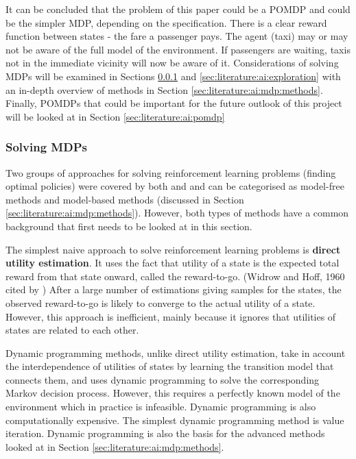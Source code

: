 It can be concluded that the problem of this paper could be a POMDP and could
be the simpler MDP, depending on the specification. There is a clear reward
function between states - the fare a passenger pays. The agent (taxi) may or
may not be aware of the full model of the environment. If passengers are
waiting, taxis not in the immediate vicinity will now be aware of it.
Considerations of solving MDPs will be examined in Sections
\ref{sec:literature:ai:mdp:solving} and \ref{sec:literature:ai:exploration}
with an in-depth overview of methods in Section
\ref{sec:literature:ai:mdp:methods}. Finally, POMDPs that could be important
for the future outlook of this project will be looked at in Section
\ref{sec:literature:ai:pomdp}


\subsubsection{Solving MDPs}
\label{sec:literature:ai:mdp:solving}

Two groups of approaches for solving reinforcement learning problems (finding
optimal policies) were covered by both \textcite{Russell2010ai+modern} and
\textcite{Sutton1998ai+reinforcement} and can be categorised as model-free
methods and model-based methods (discussed in Section
\ref{sec:literature:ai:mdp:methods}). However, both types of methods have a
common background that first needs to be looked at in this section.

The simplest naive approach to solve reinforcement learning problems is
\textbf{direct utility estimation}. It uses the fact that utility of a state is
the expected total reward from that state onward, called the reward-to-go.
(Widrow and Hoff, 1960 cited by \textcite{Russell2010ai+modern}) After a large
number of estimations giving samples for the states, the observed reward-to-go
is likely to converge to the actual utility of a state. However, this approach
is inefficient, mainly because it ignores that utilities of states are related
to each other. \parencite{Russell2010ai+modern}

Dynamic programming methods, unlike direct utility estimation, take in account
the interdependence of utilities of states by learning the transition model
that connects them, and uses dynamic programming to solve the corresponding
Markov decision process. However, this requires a perfectly known model of the
environment which in practice is infeasible. Dynamic programming is also
computationally expensive. The simplest dynamic programming method is value
iteration. Dynamic programming is also the basis for the advanced methods
looked at in Section \ref{sec:literature:ai:mdp:methods}.
\parencite{Sutton1998ai+reinforcement}

